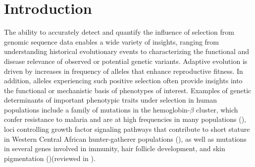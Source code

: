 \section{Introduction}

The ability to accurately detect and quantify the influence of selection from genomic sequence data enables a wide variety of insights, ranging from understanding historical evolutionary events to characterizing the functional and disease relevance of observed or potential genetic variants. Adaptive evolution is driven by increases in frequency of alleles that enhance reproductive fitness. In addition, alleles experiencing such positive selection often provide insights into the functional or mechanistic basis of phenotypes of interest. Examples of genetic determinants of important phenotypic traits under selection in human populations include a family of mutations in the hemoglobin-$\beta$ cluster, which confer resistance to malaria and are at high frequencies in many populations (\cite{currat_molecular_2002,ohashi_extended_2004}), loci controlling growth factor signaling pathways that contribute to short stature in Western Central African hunter-gatherer populations (\cite{jarvis_patterns_2012,lachance_evolutionary_2012}), as well as mutations in several genes involved in immunity, hair follicle development, and skin pigmentation (\cite{sabeti_genome-wide_2007})(reviewed in \cite{sabeti_positive_2006, kelley_positive_2008,fu_selection_2013,hejase_summary_2020}).

